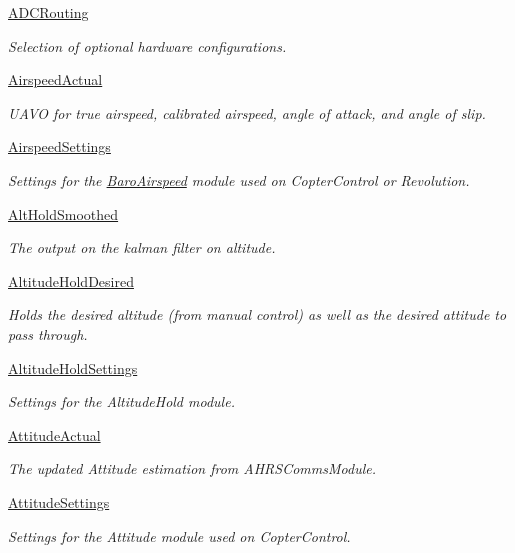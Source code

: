 \begin{DoxyCompactItemize}
\hyperlink{group___a_d_c_routing}{\-A\-D\-C\-Routing}
\begin{DoxyCompactList}\small\item\em \-Selection of optional hardware configurations. \end{DoxyCompactList}\item 
\hyperlink{group___airspeed_actual}{\-Airspeed\-Actual}
\begin{DoxyCompactList}\small\item\em \-U\-A\-V\-O for true airspeed, calibrated airspeed, angle of attack, and angle of slip. \end{DoxyCompactList}\item 
\hyperlink{group___airspeed_settings}{\-Airspeed\-Settings}
\begin{DoxyCompactList}\small\item\em \-Settings for the \hyperlink{group___baro_airspeed}{\-Baro\-Airspeed} module used on \-Copter\-Control or \-Revolution. \end{DoxyCompactList}\item 
\hyperlink{group___alt_hold_smoothed}{\-Alt\-Hold\-Smoothed}
\begin{DoxyCompactList}\small\item\em \-The output on the kalman filter on altitude. \end{DoxyCompactList}\item 
\hyperlink{group___altitude_hold_desired}{\-Altitude\-Hold\-Desired}
\begin{DoxyCompactList}\small\item\em \-Holds the desired altitude (from manual control) as well as the desired attitude to pass through. \end{DoxyCompactList}\item 
\hyperlink{group___altitude_hold_settings}{\-Altitude\-Hold\-Settings}
\begin{DoxyCompactList}\small\item\em \-Settings for the \-Altitude\-Hold module. \end{DoxyCompactList}\item 
\hyperlink{group___attitude_actual}{\-Attitude\-Actual}
\begin{DoxyCompactList}\small\item\em \-The updated \-Attitude estimation from \-A\-H\-R\-S\-Comms\-Module. \end{DoxyCompactList}\item 
\hyperlink{group___attitude_settings}{\-Attitude\-Settings}
\begin{DoxyCompactList}\small\item\em \-Settings for the \-Attitude module used on \-Copter\-Control. \end{DoxyCompactList}\item 

\end{DoxyCompactItemize}
